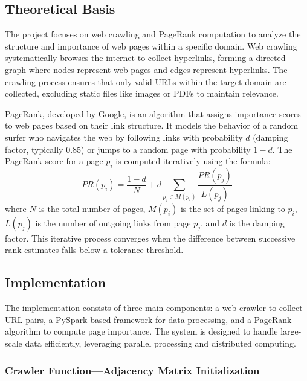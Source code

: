 \subsection{Theoretical Basis}
\label{subsec:theoretical-basis}

The project focuses on web crawling and PageRank computation to analyze the structure and importance of web pages within a specific domain.
Web crawling systematically browses the internet to collect hyperlinks, forming a directed graph where nodes represent web pages and edges represent hyperlinks.
The crawling process ensures that only valid URLs within the target domain are collected, excluding static files like images or PDFs to maintain relevance.

PageRank, developed by Google, is an algorithm that assigns importance scores to web pages based on their link structure.
It models the behavior of a random surfer who navigates the web by following links with probability $d$ (damping factor, typically 0.85) or jumps to a random page with probability $1-d$.
The PageRank score for a page $p_i$ is computed iteratively using the formula:
\begin{equation}
    PR(p_i) = \frac{1-d}{N} + d \sum_{p_j \in M(p_i)} \frac{PR(p_j)}{L(p_j)}
    \label{eq:page_rank}
\end{equation}
where $N$ is the total number of pages, $M(p_i)$ is the set of pages linking to $p_i$, $L(p_j)$ is the number of outgoing links from page $p_j$, and $d$ is the damping factor.
This iterative process converges when the difference between successive rank estimates falls below a tolerance threshold.

\subsection{Implementation}
\label{subsec:implementation}

The implementation consists of three main components: a web crawler to collect URL pairs, a PySpark-based framework for data processing, and a PageRank algorithm to compute page importance.
The system is designed to handle large-scale data efficiently, leveraging parallel processing and distributed computing.

\subsubsection{Crawler Function—Adjacency Matrix Initialization}\text{}

